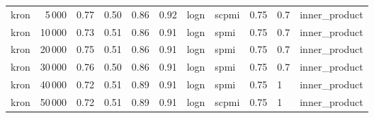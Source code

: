 \begin{tabular}{lrrrrrlllll}
    kron &            5\,000 &  0.77 &  0.50 &       0.86 &           0.92 &  logn &  scpmi &    0.75 &  0.7 &  inner\_product \\
    kron &           10\,000 &  0.73 &  0.51 &       0.86 &           0.91 &  logn &   spmi &    0.75 &  0.7 &  inner\_product \\
    kron &           20\,000 &  0.75 &  0.51 &       0.86 &           0.91 &  logn &   spmi &    0.75 &  0.7 &  inner\_product \\
    kron &           30\,000 &  0.76 &  0.50 &       0.86 &           0.91 &  logn &   spmi &    0.75 &  0.7 &  inner\_product \\
    kron &           40\,000 &  0.72 &  0.51 &       0.89 &           0.91 &  logn &   spmi &    0.75 &    1 &  inner\_product \\
    kron &           50\,000 &  0.72 &  0.51 &       0.89 &           0.91 &  logn &  scpmi &    0.75 &    1 &  inner\_product \\
\bottomrule
\end{tabular}
